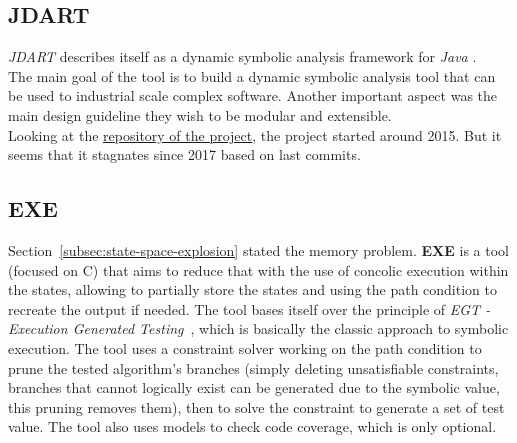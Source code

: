 \documentclass[11pt]{IEEEtran}
\begin{document}
	\subsection{JDART}
		\emph{JDART} describes itself as a dynamic symbolic analysis framework for \emph{Java} \cite{jDart}.\\
		The main goal of the tool is to build a dynamic symbolic analysis tool that can be used to industrial scale complex software. Another important aspect was the main design guideline they wish to be modular and extensible.\\


		Looking at the \href{https://github.com/psycopaths/jdart}{repository of the project}, the project started around 2015. But it seems that it stagnates since 2017 based on last commits.



    \subsection{EXE}
      \label{subsec:exe}
      Section~\ref{subsec:state-space-explosion} stated the memory problem. \textbf{EXE} is a tool (focused on C) that aims to reduce that with the use of concolic execution within the states, allowing to partially store the states and using the path condition to recreate the output if needed. The tool bases itself over the principle of \emph{EGT - Execution Generated Testing}~\cite{exe}, which is basically the classic approach to symbolic execution. The tool uses a constraint solver working on the path condition to prune the tested algorithm's branches (simply deleting unsatisfiable constraints, branches that cannot logically exist can be generated due to the symbolic value, this pruning removes them), then to solve the constraint to generate a set of test value. The tool also uses models to check code coverage, which is only optional.
\end{document}
